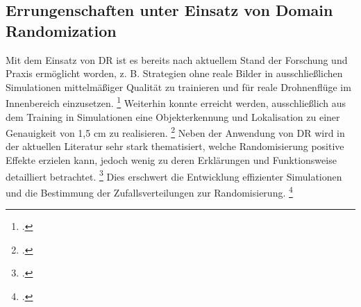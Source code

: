 \subsection{Errungenschaften unter Einsatz von Domain Randomization}

Mit dem Einsatz von DR ist es bereits nach aktuellem Stand der Forschung und Praxis ermöglicht worden, z. B. Strategien ohne reale Bilder in ausschließlichen Simulationen mittelmäßiger Qualität zu trainieren und für reale Drohnenflüge im Innenbereich einzusetzen. \footcite[Vgl.][S. 1]{Sadeghi.2016} 
Weiterhin konnte erreicht werden, ausschließlich aus dem Training in Simulationen eine Objekterkennung und Lokalisation zu einer Genauigkeit von 1,5 cm zu realisieren. \footcite[Vgl.][S. 1]{Tobin.2017}
Neben der Anwendung von DR wird in der aktuellen Literatur sehr stark thematisiert, welche Randomisierung positive Effekte erzielen kann, jedoch wenig zu deren Erklärungen und Funktionsweise detailliert betrachtet. \footcite[Vgl.][S. 6]{Zhao.2020}
Dies erschwert die Entwicklung effizienter Simulationen und die Bestimmung der Zufallsverteilungen zur Randomisierung. \footcite[Vgl.][S. 6]{Zhao.2020}